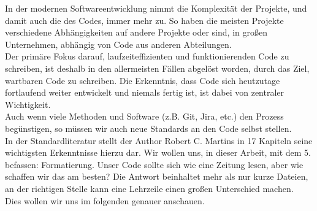 In der modernen Softwareentwicklung nimmt die Komplexität der Projekte, und damit auch die des Codes, immer mehr zu.
So haben die meisten Projekte verschiedene Abhängigkeiten auf andere Projekte oder sind, in großen Unternehmen, abhängig von Code aus anderen Abteilungen.\\
Der primäre Fokus darauf, laufzeiteffizienten und funktionierenden Code zu schreiben, ist deshalb in den allermeisten Fällen abgelöst worden, durch das Ziel, wartbaren Code zu schreiben.
Die Erkenntnis, dass Code sich heutzutage fortlaufend weiter entwickelt und niemals fertig ist, ist dabei von zentraler Wichtigkeit.\\
Auch wenn viele Methoden und Software (z.B. Git, Jira, etc.) den Prozess  begünstigen, so müssen wir auch neue Standards an den Code selbst stellen.\\
In der Standardliteratur  \autocite{martin-2008} stellt der Author Robert C. Martins in 17 Kapiteln seine wichtigsten Erkenntnisse hierzu dar.
Wir wollen uns, in dieser Arbeit, mit dem 5. befassen: Formatierung.
Unser Code sollte sich wie eine Zeitung lesen, aber wie schaffen wir das am besten?
Die Antwort beinhaltet mehr als nur kurze Dateien, an der richtigen Stelle kann eine Lehrzeile einen großen Unterschied machen.\\
Dies wollen wir uns im folgenden genauer anschauen.
